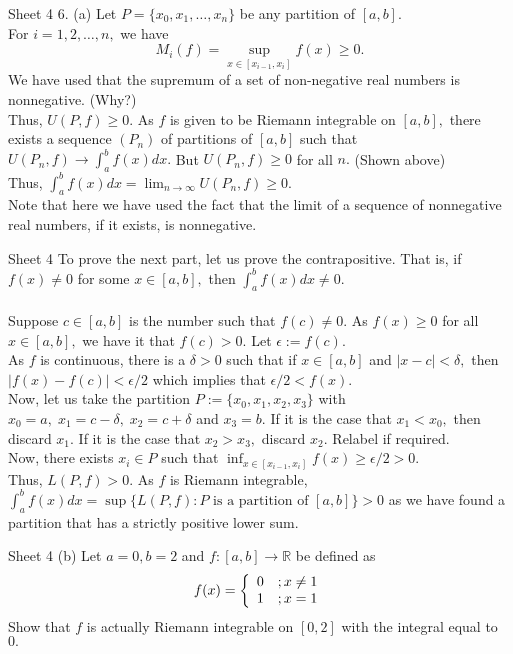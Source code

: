 \documentclass[handout, aspectratio=169]{beamer}
\begin{document}
\begin{frame}{Sheet 4}
	6. (a) Let $P = \{x_0, x_1, \ldots, x_n\}$ be any partition of $[a, b].$\\
	For $i = 1, 2, \ldots, n,$ we have
	\[M_i(f) = \sup_{x \in [x_{i-1}, x_i]}f(x) \ge 0.\]
	We have used that the supremum of a set of non-negative real numbers is nonnegative. (Why?)\\
	Thus, $U(P, f) \ge 0.$ As $f$ is given to be Riemann integrable on $[a, b],$ there exists a sequence $(P_n)$ of partitions of $[a, b]$ such that $U(P_n, f) \to \displaystyle\int_{a}^{b} f(x) dx .$ But $U(P_n, f) \ge 0$ for all $n.$ (Shown above)\\
	Thus, $\displaystyle\int_{a}^{b} f(x) dx = \lim_{n\to \infty}U(P_n, f) \ge 0.$\\
	Note that here we have used the fact that the limit of a sequence of nonnegative real numbers, if it exists, is nonnegative.
\end{frame}
\begin{frame}{Sheet 4}
	To prove the next part, let us prove the contrapositive. That is, if $f(x) \neq 0$ for some $x \in [a, b],$ then $\displaystyle\int_{a}^{b} f(x) dx \neq 0.$\\~\\
	Suppose $c \in [a, b]$ is the number such that $f(c) \neq 0.$ As $f(x) \ge 0$ for all $x \in [a, b],$ we have it that $f(c) > 0.$ Let $\epsilon := f(c).$\\
	As $f$ is continuous, there is a $\delta > 0$ such that if $x \in [a, b]$ and $|x - c| < \delta,$ then $|f(x) - f(c)| < \epsilon/2$ which implies that $\epsilon/2 < f(x).$\\
	Now, let us take the partition $P := \{x_0, x_1, x_2, x_3\}$ with $x_0 = a,\; x_1 = c-\delta,\;x_2 = c+\delta$ and $x_3 = b.$ If it is the case that $x_1 < x_0,$ then discard $x_1.$ If it is the case that $x_2 > x_3,$ discard $x_2.$ Relabel if required.\\
	Now, there exists $x_i \in P$ such that $\displaystyle\inf_{x \in [{x_{i-1}, x_i}]}f(x) \ge \epsilon/2 > 0.$\\
	Thus, $L(P, f) > 0.$ As $f$ is Riemann integrable, $\displaystyle\int_{a}^{b} f(x) dx = \sup\{L(P, f): P \text{ is a partition of } [a, b]\} > 0$ as we have found a partition that has a strictly positive lower sum.
\end{frame}
\begin{frame}{Sheet 4}
	(b) Let $a = 0, b = 2$ and $f:[a, b] \to \mathbb{R}$ be defined as
	\[f(x) = \left\{\begin{array}[h]{c l}
		0 & ; x \neq 1 \\
		1 & ; x = 1
	\end{array}
	\right.\]
	Show that $f$ is actually Riemann integrable on $[0, 2]$ with the integral equal to $0.$
\end{frame}
\end{document}

